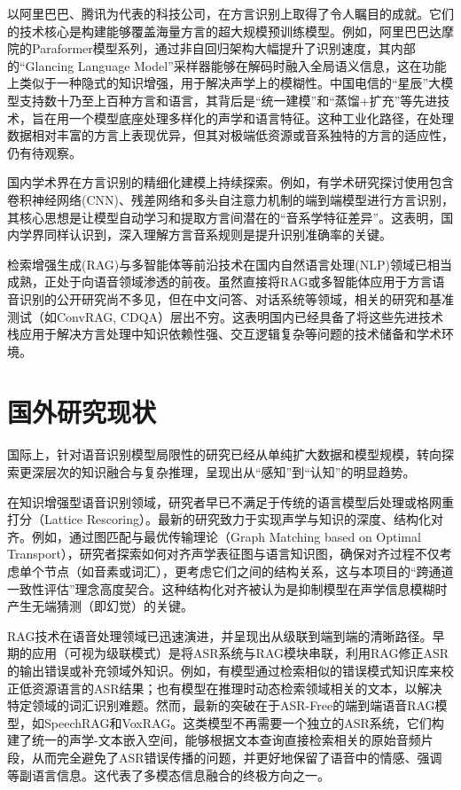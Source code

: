 以阿里巴巴、腾讯为代表的科技公司，在方言识别上取得了令人瞩目的成就。它们的技术核心是构建能够覆盖海量方言的超大规模预训练模型。例如，阿里巴巴达摩院的Paraformer模型系列，通过非自回归架构大幅提升了识别速度，其内部的“Glancing Language Model”采样器能够在解码时融入全局语义信息，这在功能上类似于一种隐式的知识增强，用于解决声学上的模糊性。中国电信的“星辰”大模型支持数十乃至上百种方言和语言，其背后是“统一建模”和“蒸馏+扩充”等先进技术，旨在用一个模型底座处理多样化的声学和语言特征。这种工业化路径，在处理数据相对丰富的方言上表现优异，但其对极端低资源或音系独特的方言的适应性，仍有待观察。

国内学术界在方言识别的精细化建模上持续探索。例如，有学术研究探讨使用包含卷积神经网络(CNN)、残差网络和多头自注意力机制的端到端模型进行方言识别，其核心思想是让模型自动学习和提取方言间潜在的“音系学特征差异”。这表明，国内学界同样认识到，深入理解方言音系规则是提升识别准确率的关键。

检索增强生成(RAG)与多智能体等前沿技术在国内自然语言处理(NLP)领域已相当成熟，正处于向语音领域渗透的前夜。虽然直接将RAG或多智能体应用于方言语音识别的公开研究尚不多见，但在中文问答、对话系统等领域，相关的研究和基准测试（如ConvRAG, CDQA）层出不穷。这表明国内已经具备了将这些先进技术栈应用于解决方言处理中知识依赖性强、交互逻辑复杂等问题的技术储备和学术环境。


\section{国外研究现状}

国际上，针对语音识别模型局限性的研究已经从单纯扩大数据和模型规模，转向探索更深层次的知识融合与复杂推理，呈现出从“感知”到“认知”的明显趋势。

在知识增强型语音识别领域，研究者早已不满足于传统的语言模型后处理或格网重打分（Lattice Rescoring）。最新的研究致力于实现声学与知识的深度、结构化对齐。例如，通过图匹配与最优传输理论（Graph Matching based on Optimal Transport），研究者探索如何对齐声学表征图与语言知识图，确保对齐过程不仅考虑单个节点（如音素或词汇），更考虑它们之间的结构关系，这与本项目的“跨通道一致性评估”理念高度契合。这种结构化对齐被认为是抑制模型在声学信息模糊时产生无端猜测（即幻觉）的关键。

RAG技术在语音处理领域已迅速演进，并呈现出从级联到端到端的清晰路径。早期的应用（可视为级联模式）是将ASR系统与RAG模块串联，利用RAG修正ASR的输出错误或补充领域外知识。例如，有模型通过检索相似的错误模式知识库来校正低资源语言的ASR结果；也有模型在推理时动态检索领域相关的文本，以解决特定领域的词汇识别难题。然而，最新的突破在于ASR-Free的端到端语音RAG模型，如SpeechRAG和VoxRAG。这类模型不再需要一个独立的ASR系统，它们构建了统一的声学-文本嵌入空间，能够根据文本查询直接检索相关的原始音频片段，从而完全避免了ASR错误传播的问题，并更好地保留了语音中的情感、强调等副语言信息。这代表了多模态信息融合的终极方向之一。

